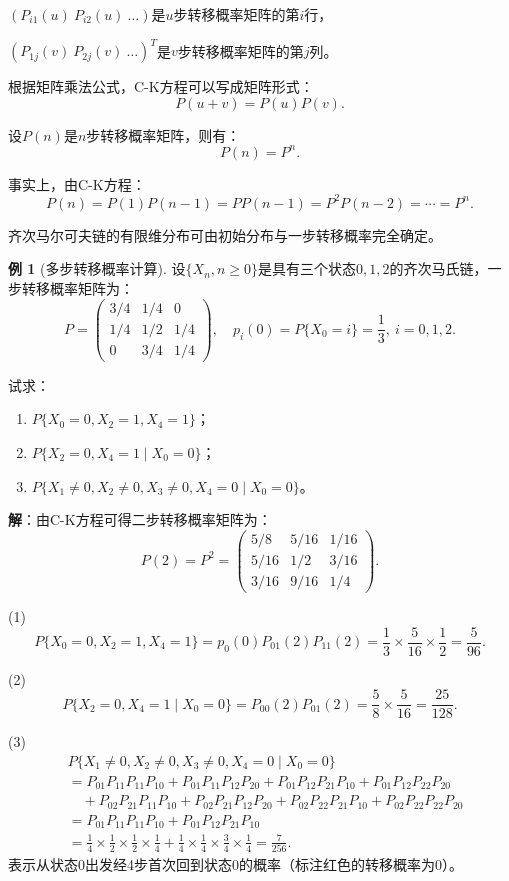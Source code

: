\documentclass[11pt,a4paper]{report}
\theoremstyle{definition}
\newtheorem{example}{例}[chapter]
\begin{document}
$(P_{i1}(u)\ P_{i2}(u)\ \ldots)$是$u$步转移概率矩阵的第$i$行，

$(P_{1j}(v)\ P_{2j}(v)\ \ldots)^T$是$v$步转移概率矩阵的第$j$列。

根据矩阵乘法公式，C-K方程可以写成矩阵形式：
\[
P(u+v)=P(u)P(v).
\]

设$P(n)$是$n$步转移概率矩阵，则有：
\[
P(n)=P^n.
\]

事实上，由C-K方程：
\[
P(n)=P(1)P(n-1)=PP(n-1)=P^2P(n-2)=\cdots=P^n.
\]

齐次马尔可夫链的有限维分布可由初始分布与一步转移概率完全确定。

\begin{example}[多步转移概率计算]
设$\{X_n,n\geq0\}$是具有三个状态$0,1,2$的齐次马氏链，一步转移概率矩阵为：
\[
P=
\begin{pmatrix}
3/4 & 1/4 & 0\\
1/4 & 1/2 & 1/4\\
0 & 3/4 & 1/4
\end{pmatrix},
\quad p_i(0)=P\{X_0=i\}=\frac{1}{3},\ i=0,1,2.
\]

试求：
\begin{enumerate}[label=(\arabic*)]
    \item $P\{X_0=0,X_2=1,X_4=1\}$；
    \item $P\{X_2=0,X_4=1\mid X_0=0\}$；
    \item $P\{X_1\neq0,X_2\neq0,X_3\neq0,X_4=0\mid X_0=0\}$。
\end{enumerate}

\textbf{解}：由C-K方程可得二步转移概率矩阵为：
\[
P(2)=P^2=
\begin{pmatrix}
5/8 & 5/16 & 1/16\\
5/16 & 1/2 & 3/16\\
3/16 & 9/16 & 1/4
\end{pmatrix}.
\]

(1)
\[
P\{X_0=0,X_2=1,X_4=1\}=p_0(0)P_{01}(2)P_{11}(2)=\frac{1}{3}\times\frac{5}{16}\times\frac{1}{2}=\frac{5}{96}.
\]

(2)
\[
P\{X_2=0,X_4=1\mid X_0=0\}=P_{00}(2)P_{01}(2)=\frac{5}{8}\times\frac{5}{16}=\frac{25}{128}.
\]

(3)
\begin{align*}
&P\{X_1\neq0,X_2\neq0,X_3\neq0,X_4=0\mid X_0=0\}\\
&=P_{01}P_{11}P_{11}P_{10}+P_{01}P_{11}P_{12}P_{20}+P_{01}P_{12}P_{21}P_{10}+P_{01}P_{12}P_{22}P_{20}\\
&\quad+P_{02}P_{21}P_{11}P_{10}+P_{02}P_{21}P_{12}P_{20}+P_{02}P_{22}P_{21}P_{10}+P_{02}P_{22}P_{22}P_{20}\\
&=P_{01}P_{11}P_{11}P_{10}+P_{01}P_{12}P_{21}P_{10}\\
&=\frac{1}{4}\times\frac{1}{2}\times\frac{1}{2}\times\frac{1}{4}+\frac{1}{4}\times\frac{1}{4}\times\frac{3}{4}\times\frac{1}{4}=\frac{7}{256}.
\end{align*}
表示从状态0出发经4步首次回到状态0的概率（标注红色的转移概率为0）。
\end{example}
\end{document}
